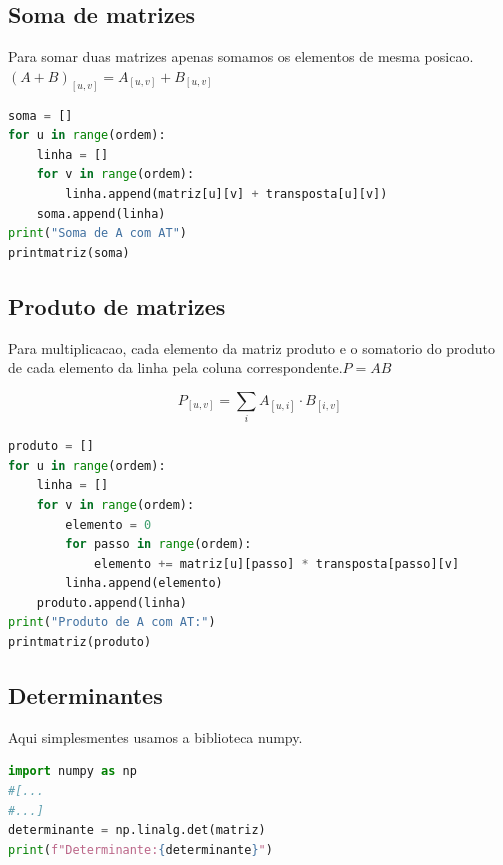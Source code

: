 \documentclass{article}
\begin{document}
\subsection{Soma de matrizes}
Para somar duas matrizes apenas somamos os elementos de mesma posicao. $(A+B)_{[u,v]}=A_{[u,v]}+ B_{[u,v]}$

\begin{lstlisting}[language=Python]
soma = []
for u in range(ordem):
    linha = []
    for v in range(ordem):
        linha.append(matriz[u][v] + transposta[u][v])
    soma.append(linha)
print("Soma de A com AT")
printmatriz(soma)
\end{lstlisting}

\subsection{Produto de matrizes}
Para multiplicacao, cada elemento da matriz produto e o somatorio do produto de cada elemento da linha pela coluna correspondente.$P = AB$

\[
P_{[u,v]}= \sum_i A_{[u,i]} \cdot B_{[i,v]}
\]

\begin{lstlisting}[language=Python]
produto = []
for u in range(ordem):
    linha = []
    for v in range(ordem):
        elemento = 0
        for passo in range(ordem):
            elemento += matriz[u][passo] * transposta[passo][v]
        linha.append(elemento)
    produto.append(linha)
print("Produto de A com AT:")
printmatriz(produto)
\end{lstlisting}

\subsection{Determinantes}
Aqui simplesmentes usamos a biblioteca numpy.

\begin{lstlisting}[language=Python]
import numpy as np
#[...
#...]
determinante = np.linalg.det(matriz)
print(f"Determinante:{determinante}")
\end{lstlisting}
\end{document}
